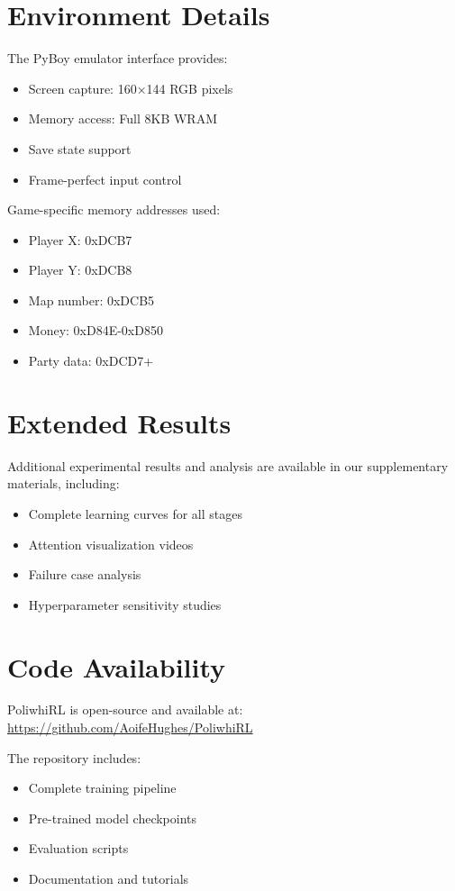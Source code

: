 \documentclass[12pt,a4paper]{article}
\begin{document}
\section{Environment Details}

The PyBoy emulator interface provides:
\begin{itemize}
    \item Screen capture: 160×144 RGB pixels
    \item Memory access: Full 8KB WRAM
    \item Save state support
    \item Frame-perfect input control
\end{itemize}

Game-specific memory addresses used:
\begin{itemize}
    \item Player X: 0xDCB7
    \item Player Y: 0xDCB8  
    \item Map number: 0xDCB5
    \item Money: 0xD84E-0xD850
    \item Party data: 0xDCD7+
\end{itemize}

\section{Extended Results}

Additional experimental results and analysis are available in our supplementary materials, including:
\begin{itemize}
    \item Complete learning curves for all stages
    \item Attention visualization videos
    \item Failure case analysis
    \item Hyperparameter sensitivity studies
\end{itemize}

\section{Code Availability}

PoliwhiRL is open-source and available at:
\url{https://github.com/AoifeHughes/PoliwhiRL}

The repository includes:
\begin{itemize}
    \item Complete training pipeline
    \item Pre-trained model checkpoints
    \item Evaluation scripts
    \item Documentation and tutorials
\end{itemize}
\end{document}
